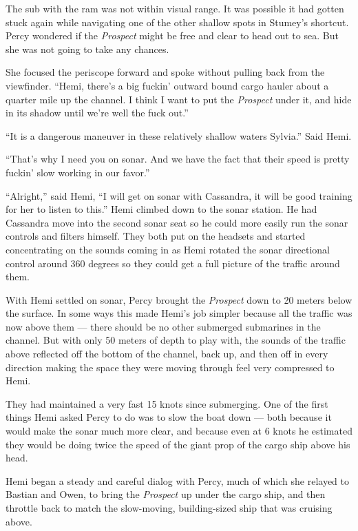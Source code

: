 \documentclass[]{scrbook}
\begin{document}
The sub with the ram was not within visual range. It was possible it had
gotten stuck again while navigating one of the other shallow spots in
Stumey's shortcut. Percy wondered if the \emph{Prospect} might be free
and clear to head out to sea. But she was not going to take any chances.

She focused the periscope forward and spoke without pulling back from
the viewfinder. ``Hemi, there's a big fuckin' outward bound cargo hauler
about a quarter mile up the channel. I think I want to put the
\emph{Prospect} under it, and hide in its shadow until we're well the
fuck out.''

``It is a dangerous maneuver in these relatively shallow waters
Sylvia.'' Said Hemi.

``That's why I need you on sonar. And we have the fact that their speed
is pretty fuckin' slow working in our favor.''

``Alright,'' said Hemi, ``I will get on sonar with Cassandra, it will be
good training for her to listen to this.'' Hemi climbed down to the
sonar station. He had Cassandra move into the second sonar seat so he
could more easily run the sonar controls and filters himself. They both
put on the headsets and started concentrating on the sounds coming in as
Hemi rotated the sonar directional control around 360 degrees so they
could get a full picture of the traffic around them.

With Hemi settled on sonar, Percy brought the \emph{Prospect} down to 20
meters below the surface. In some ways this made Hemi's job simpler
because all the traffic was now above them --- there should be no other
submerged submarines in the channel. But with only 50 meters of depth to
play with, the sounds of the traffic above reflected off the bottom of
the channel, back up, and then off in every direction making the space
they were moving through feel very compressed to Hemi.

They had maintained a very fast 15 knots since submerging. One of the
first things Hemi asked Percy to do was to slow the boat down --- both
because it would make the sonar much more clear, and because even at 6
knots he estimated they would be doing twice the speed of the giant prop
of the cargo ship above his head.

Hemi began a steady and careful dialog with Percy, much of which she
relayed to Bastian and Owen, to bring the \emph{Prospect} up under the
cargo ship, and then throttle back to match the slow-moving,
building-sized ship that was cruising above.
\end{document}
